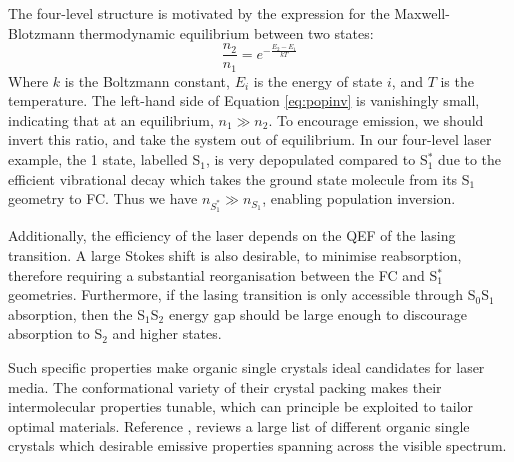 The four-level structure is motivated by the expression for the Maxwell-Blotzmann thermodynamic equilibrium between two states:
\begin{equation}
    \frac{n_2}{n_1} = e^{-\frac{E_2-E_1}{kT}}
    \label{eq:popinv}
\end{equation}
Where $k$ is the Boltzmann constant, $E_i$ is the energy of state $i$, and $T$ is the temperature. The left-hand side of Equation \ref{eq:popinv} is vanishingly small, indicating that at an equilibrium, $n_1 \gg n_2$. To encourage emission, we should invert this ratio, and take the system out of equilibrium. In our four-level laser example, the 1 state, labelled S$_1$, is very depopulated compared to S$_1^*$ due to the efficient vibrational decay which takes the ground state molecule from its S$_1$ geometry to FC. Thus we have $n_{S_1^*} \gg n_{S_1}$, enabling population inversion.

Additionally, the efficiency of the laser depends on the QEF of the lasing transition. A large Stokes shift is also desirable, to minimise reabsorption, therefore requiring a substantial reorganisation between the FC and S$_1^*$ geometries. Furthermore, if the lasing transition is only accessible through S$_0$\textendash{}S$_1$ absorption, then the S$_1$\textendash{}S$_2$ energy gap should be large enough to discourage absorption to S$_2$ and higher states.

Such specific properties make organic single crystals ideal candidates for laser media. The conformational variety of their crystal packing makes their intermolecular properties tunable, which can principle be exploited to tailor optimal materials. Reference , reviews a large list of different organic single crystals which desirable emissive properties spanning across the visible spectrum.
